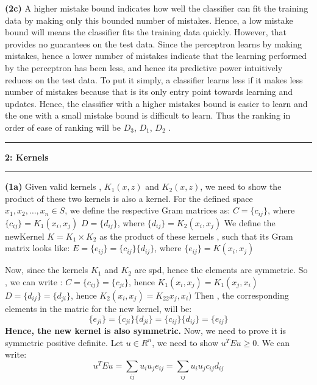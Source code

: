 \documentclass{article}
\newcommand\question[2]{\vspace{.25in}\hrule\textbf{#1: #2}\hrule\vspace{.10in}}
\renewcommand\part[1]{\vspace{.10in}\textbf{(#1)}}
\begin{document}
    \part{2c} A higher mistake bound indicates how well the classifier can fit the training data by making only this bounded number of mistakes. Hence, a low mistake bound will means the classifier fits the training data quickly. However, that provides no guarantees on the test data. Since the perceptron learns by making mistakes, hence a lower number of mistakes indicate that the learning performed by the perceptron has been less, and hence its predictive power intuitively reduces on the test data. To put it simply, a classifier learns less if it makes less number of mistakes because that is its only entry point towards learning and updates. Hence, the classifier with a higher mistakes bound is easier to learn and the one with a small mistake bound is difficult to learn. Thus the ranking in order of ease of ranking will be $D_3$, $D_1$, $D_2$ . \newline

    \question{2}{Kernels}
    \part{1a} Given valid kernels , $K_1(x,z)$ and $K_2(x,z)$, we need to show the product of these two kernels is also a kernel. For the defined space $x_1, x_2, \dots, x_n \in S$, we define the respective Gram matrices as: \newline
    $ C = \{c_{ij}\}$, where $\{c_{ij}\} = K_1(x_i, x_j) $ \newline
    $ D = \{d_{ij}\}$, where $\{d_{ij}\} = K_2(x_i, x_j) $ \newline
    We define the newKernel $K=K_1 \times K_2$ as the product of these kernels , such that its Gram matrix looks like: \newline
    $ E = \{e_{ij}\} = \{c_{ij}\}\{d_{ij}\}$, where $\{e_{ij}\}  = K(x_i, x_j) $ \newline

    Now, since the kernels $K_1$ and $K_2$ are spd, hence the elements are symmetric. So , we can write : \newline
    $ C = \{c_{ij}\} = \{c_{ji}\}$, hence $ K_1(x_i, x_j) = K_1(x_j, x_i) $
    $ D = \{d_{ij}\} = \{d_{ji}\}$, hence $ K_2(x_i, x_j) = K_22x_j, x_i) $
    Then , the corresponding elements in the matric for the new kernel, will be:
    \[ \{e_{ji}\} = \{c_{ji}\}\{d_{ji}\} = \{c_{ij}\}\{d_{ij}\} = \{e_{ij}\}  \]
    \textbf {Hence, the new kernel is also symmetric. }
    Now, we need to prove it is symmetric positive definite. Let $u \in R^n$, we need to show $u^TEu \geq 0$. We can write:\newline
    \begin{equation}
    u^TEu = \sum_{ij} u_i u_j e_{ij} = \sum_{ij} u_i u_j c_{ij} d_{ij}
    \end{equation}
\end{document}
